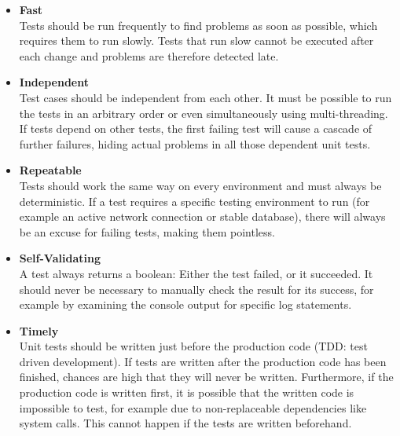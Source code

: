     \begin{itemize}
        \item \textbf{Fast}\\
                Tests should be run frequently to find problems as soon as possible, which requires them to run slowly.
                Tests that run slow cannot be executed after each change and problems are therefore detected late.  
        \item \textbf{Independent}\\
                Test cases should be independent from each other. It must be possible to run the tests in an arbitrary
                order or even simultaneously using multi-threading. If tests depend on other tests, the first failing
                test will cause a cascade of further failures, hiding actual problems in all those dependent unit tests.
        \item \textbf{Repeatable}\\
                Tests should work the same way on every environment and must always be deterministic. If a test requires
                a specific testing environment to run (for example an active network connection or stable database), there
                will always be an excuse for failing tests, making them pointless.
        \item \textbf{Self-Validating}\\
                A test always returns a boolean: Either the test failed, or it succeeded. It should never be necessary
                to manually check the result for its success, for example by examining the console output for specific log
                statements. 
        \item \textbf{Timely}\\
                Unit tests should be written just before the production code (TDD: test driven development). If tests are written
                after the production code has been finished, chances are high that they will never be written.
                Furthermore, if the production code is written first, it is possible that the written code is impossible to test,
                for example due to non-replaceable dependencies like system calls.
                This cannot happen if the tests are written beforehand.
    \end{itemize}


